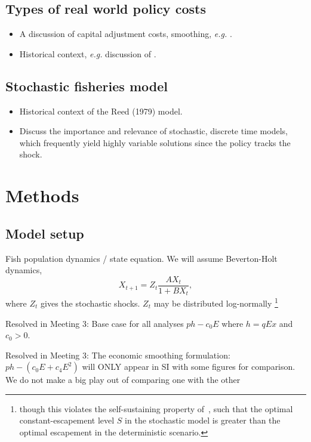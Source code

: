 \documentclass[authoryear, review, 12pt]{elsarticle}
\newcommand{\pa}[1]{{\it \color{darkblue} #1}}
\begin{document}
\subsection{Types of real world policy costs}

\begin{itemize}
  \item A discussion of capital adjustment costs, smoothing, \emph{e.g.} \citet{Singh2006}.
  \item Historical context, \emph{e.g.} discussion of \citep{Bohm1974, Reed1979, Xepapadeas1992}.  
\end{itemize}
\subsection{Stochastic fisheries model}
\begin{itemize}
\item Historical context of the Reed (1979) model.  
\item Discuss the importance and relevance of stochastic, discrete time models, which frequently yield highly variable solutions since the policy tracks the shock.  
\end{itemize}


\section{Methods}

\subsection{Model setup}

  Fish population dynamics / state equation.  We will assume Beverton-Holt dynamics,
    \begin{equation} 
      X_{t+1} = Z_t \frac{A X_t}{1 + B X_t}, 
    \end{equation}
where $Z_t$ gives the stochastic shocks.  $Z_t$ may be distributed log-normally \footnote{though this violates the self-sustaining property of~\citet{Reed1979}, such that the optimal constant-escapement level $S$ in the stochastic model is greater than the optimal escapement in the deterministic scenario.}

\pa{

Resolved in Meeting 3: Base case for all analyses $ph-c_0E$ where $h=qEx$ and $c_0>0$.

Resolved in Meeting 3: The economic smoothing formulation: $ph - (c_0 E+c_4 E^2)$ will ONLY appear in SI with some figures for comparison. We do not make a big play out of comparing one with the other
}
\end{document}
